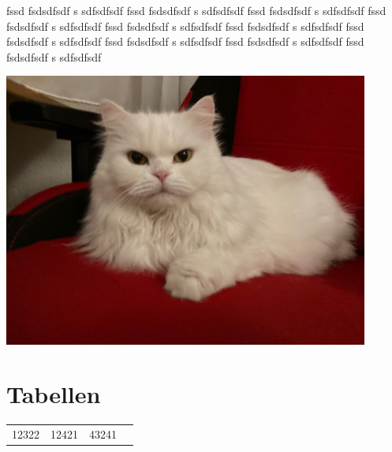 \documentclass[12pt,ngerman,parskip=half]{scrreprt}
\begin{document}
\blindtext[2] fssd fsdsdfsdf s sdfsdfsdf fssd fsdsdfsdf s sdfsdfsdf fssd fsdsdfsdf s sdfsdfsdf fssd fsdsdfsdf s sdfsdfsdf fssd fsdsdfsdf s sdfsdfsdf fssd fsdsdfsdf s sdfsdfsdf fssd fsdsdfsdf s sdfsdfsdf fssd fsdsdfsdf s sdfsdfsdf fssd fsdsdfsdf s sdfsdfsdf fssd fsdsdfsdf s sdfsdfsdf 


\begin{minipage}{\textwidth}
\begin{center}
\includegraphics[width=0.9\textwidth]{./Bilder/Katze.jpg} %
\label{fig:katze2}
\end{center}
\end{minipage}


\chapter{Tabellen}\label{ch:tabelle}

\begin{tabular}{|l|c|r|p{5cm}}
12322 & 12421 & 43241 &

\end{tabular}
\end{document}
